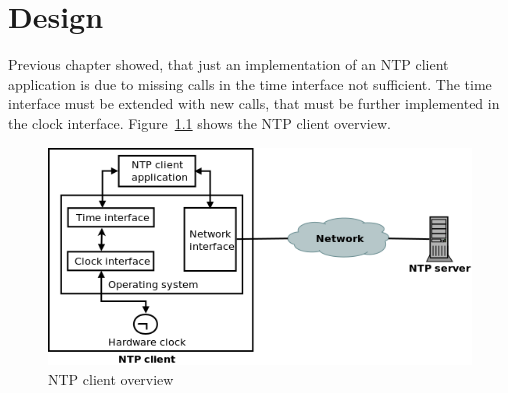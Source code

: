 
\chapter{Design}
Previous chapter showed, that just an implementation of an
NTP client application is due to missing calls in the time interface not sufficient.
The time interface must be extended with new calls,
that must be further implemented in the clock interface.
Figure~\ref{fig:design-overview} shows the NTP client overview.

\begin{figure}[H]
  \centering
  \includegraphics[width=13cm,keepaspectratio]{fig/design.png}
  \caption{NTP client overview} %
  \label{fig:design-overview} %
\end{figure}










%
